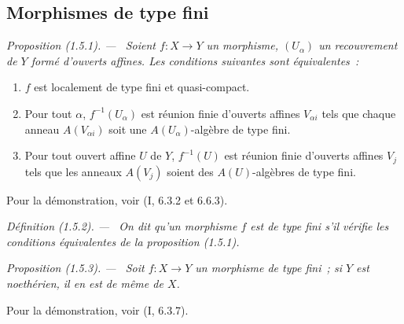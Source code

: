 \documentclass[10pt,oneside]{book}
\makeatletter
\newcommand{\setmanualcurrentlabel}[1]{\def\@currentlabel{#1}}
\newcommand{\oldpage}[2][]{%
  \setcounter{footnote}{0}%
  \marginpar{\scriptsize\textbf{#1}~|~#2}\ignorespaces}
\newenvironment{definition}[1][]{%
  \setmanualcurrentlabel{#1}\par\medskip\noindent\itshape Définition (#1). ---\ }{\par}
\newenvironment{proposition}[1][]{%
  \setmanualcurrentlabel{#1}\par\medskip\noindent\itshape Proposition (#1). ---\ }{\par}
\makeatother
\begin{document}
\subsection{Morphismes de type fini}
\label{subsection:IV.1.5-fr}

\begin{proposition}[1.5.1]
\label{IV.1.5.1-fr}
Soient $f:X\to Y$ un morphisme, $(U_\alpha)$ un recouvrement de $Y$ formé
d'ouverts affines. Les conditions suivantes sont équivalentes~:
\begin{enumerate}
  \item[a)] $f$ est localement de type fini et quasi-compact.
  \item[b)] Pour tout $\alpha$, $f^{-1}(U_\alpha)$ est réunion finie d'ouverts
  affines $V_{\alpha i}$ tels que chaque anneau $A(V_{\alpha i})$ soit une
  $A(U_\alpha)$-algèbre de type fini.
  \item[c)] Pour tout ouvert affine $U$ de $Y$, $f^{-1}(U)$ est réunion finie
  d'ouverts affines $V_j$ tels que les anneaux $A(V_j)$ soient des
  $A(U)$-algèbres de type fini.
\end{enumerate}
\end{proposition}

Pour la démonstration, voir (I, 6.3.2 et 6.6.3).

\begin{definition}[1.5.2]
\label{IV.1.5.2-fr}
On dit qu'un morphisme $f$ est \emph{de type fini} s'il vérifie les conditions
équivalentes de la proposition (1.5.1).
\end{definition}

\oldpage[IV-1]{234}

\begin{proposition}[1.5.3]
\label{IV.1.5.3-fr}
Soit $f:X\to Y$ un morphisme de type fini~; si $Y$ est noethérien, il en est
de même de $X$.
\end{proposition}

Pour la démonstration, voir (I, 6.3.7).
\end{document}
